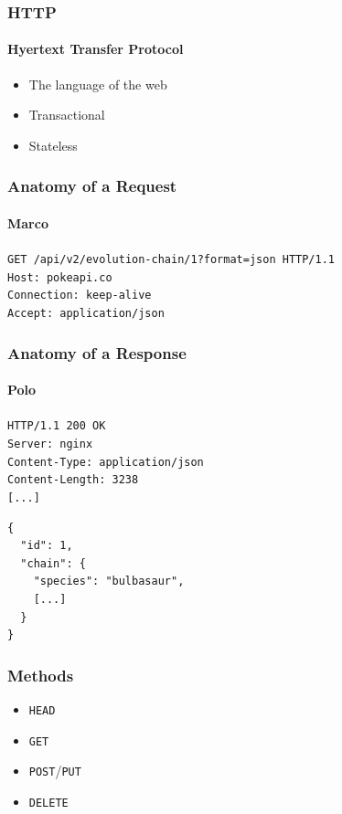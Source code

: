 \documentclass[dvipsnames]{beamer}
\begin{document}
\begin{frame}
  \frametitle{HTTP}
  \framesubtitle{Hyertext Transfer Protocol}
  \begin{itemize}
    \item The language of the web
    \item Transactional
    \item Stateless
  \end{itemize}
\end{frame}


\begin{frame}
  \frametitle{Anatomy of a Request}
  \framesubtitle{Marco}
  \texttt{{\color{red}GET} {\color{OliveGreen}/api/v2/evolution-chain/1}{\color{purple}?format=json} {\color{blue}HTTP/1.1}} \\
  \pause
  \bigskip
  {
    \color{olive}
    \texttt{Host: pokeapi.co} \\
    \texttt{Connection: keep-alive} \\
    \texttt{Accept: application/json} \\
  }
\end{frame}


\begin{frame}[fragile=singleslide]
  \frametitle{Anatomy of a Response}
  \framesubtitle{Polo}

  \texttt{{\color{blue}HTTP/1.1} \color{orange}200 OK} \\
  {
    \color{olive}
    \texttt{Server: nginx} \\
    \texttt{Content-Type: application/json} \\
    \texttt{Content-Length: 3238} \\
    \texttt{[...]} \\
  } \bigskip

  {
    \color{violet}
    \begin{verbatim}
{
  "id": 1,
  "chain": {
    "species": "bulbasaur",
    [...]
  }
}
    \end{verbatim}
  }
\end{frame}


\begin{frame}
  \frametitle{Methods}
  \begin{itemize}
    \item \texttt{HEAD}
    \item \texttt{GET}
    \item \texttt{POST}/\texttt{PUT}
    \item \texttt{DELETE}
  \end{itemize}
\end{frame}
\end{document}
